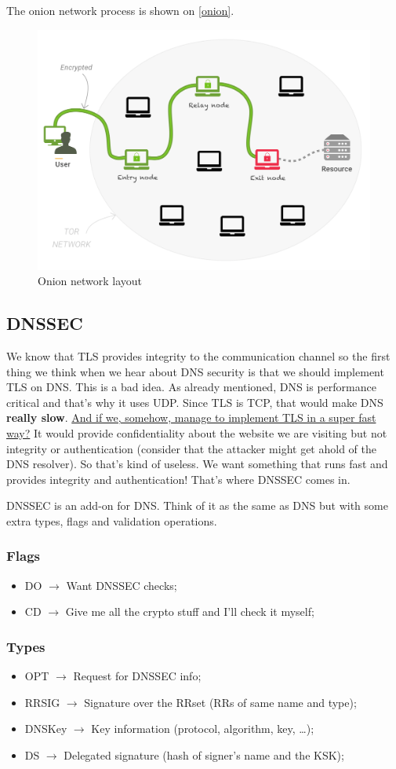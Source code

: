 \documentclass[11pt]{article}
\begin{document}
{The onion network process is shown on \ref{onion}.

\begin{figure}[htbp]
\centering
\includegraphics[height=0.5\textwidth]{res/onion.png}
\caption{\label{fig:org8864b29}Onion network layout}
\end{figure}
\subsection{DNSSEC}
\label{sec:org9eb95a3}
We know that TLS provides integrity to the communication channel so the first thing we think when we hear about DNS security is that we should implement TLS on DNS. This is a bad idea. As already mentioned, DNS is performance critical and that's why it uses UDP. Since TLS is TCP, that would make DNS \textbf{really slow}. \uline{And if we, somehow, manage to implement TLS in a super fast way?} It would provide confidentiality about the website we are visiting but not integrity or authentication (consider that the attacker might get ahold of the DNS resolver). So that's kind of useless. We want something that runs fast and provides integrity and authentication! That's where DNSSEC comes in.

DNSSEC is an add-on for DNS. Think of it as the same as DNS but with some extra types, flags and validation operations.
\subsubsection{Flags}
\label{sec:org4af370b}
\begin{itemize}
\item DO \(\to\) Want DNSSEC checks;
\item CD \(\to\) Give me all the crypto stuff and I'll check it myself;
\end{itemize}
\subsubsection{Types}
\label{sec:org4339a04}
\begin{itemize}
\item OPT \(\to\) Request for DNSSEC info;
\item RRSIG \(\to\) Signature over the RRset (RRs of same name and type);
\item DNSKey \(\to\) Key information (protocol, algorithm, key, \ldots{});
\item DS \(\to\) Delegated signature (hash of signer's name and the KSK);
\end{itemize}
}
\end{document}
